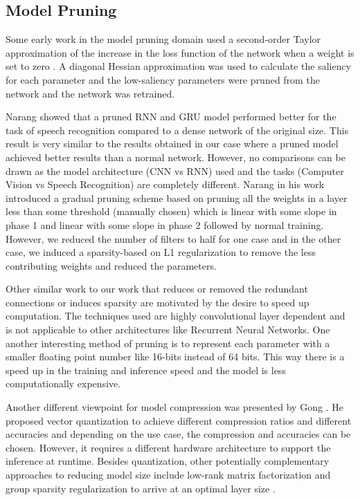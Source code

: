 \subsection{Model Pruning}

Some early work in the model pruning domain used a second-order Taylor approximation of the increase in the loss function of the network when a weight is set to zero \cite{lecun1990optimal}. A diagonal Hessian approximation was used to calculate the saliency for each parameter \cite{lecun1990optimal} and the low-saliency parameters were pruned from the network and the network was retrained.


Narang \cite{DBLP:journals/corr/NarangDSE17} showed that a pruned RNN and GRU model performed better for the task of speech recognition compared to a dense network of the original size. This result is very similar to the results obtained in our case where a pruned model achieved better results than a normal network. However, no comparisons can be drawn as the model architecture (CNN vs RNN) used and the tasks (Computer Vision vs Speech Recognition) are completely different.  Narang \cite{DBLP:journals/corr/NarangDSE17} in his work introduced a gradual pruning scheme based on pruning all the weights in a layer
less than some threshold (manually chosen) which is linear with some
slope in phase 1 and linear with some slope in phase 2 followed by
normal training. However, we reduced the number of filters to half for one case and in the other case, we induced a sparsity-based on L1 regularization to remove the less contributing weights and reduced the parameters. 


Other similar work \cite{DBLP:journals/corr/AnwarHS15, DBLP:journals/corr/LebedevGROL14, DBLP:journals/corr/ChangpinyoSZ17} to our work that reduces or removed the redundant connections or induces sparsity are motivated by the desire to speed up computation.
The techniques used are highly convolutional layer dependent and is not applicable to other architectures like Recurrent Neural Networks. 
One another interesting method of pruning is to represent each parameter with a smaller floating point number like 16-bits instead of 64 bits. This way there is a speed up in the training and inference speed and the model is less computationally expensive. 

Another different viewpoint for model compression was presented by Gong \cite{DBLP:journals/corr/GongLYB14}. He proposed vector quantization to achieve different compression ratios and different accuracies and depending on the use case, the compression and accuracies can be chosen. However, it requires a different hardware architecture to support the inference at runtime. Besides quantization, other potentially complementary approaches to reducing model size include low-rank matrix factorization \cite{denton2014exploiting, DBLP:journals/corr/LebedevGROL14} and group sparsity regularization to arrive at an optimal layer size \cite{DBLP:conf/nips/AlvarezS16}.

